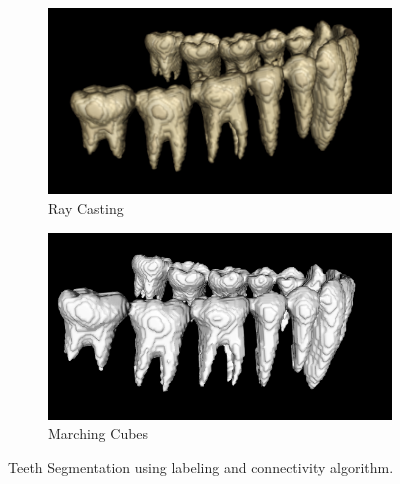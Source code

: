 \documentclass[11.5pt, b5paper]{article}
\begin{document}
\begin{figure}
    \centering
    \begin{subfigure}[b]{0.45\textwidth}
        \centering
        \includegraphics[width=\textwidth]{RCSO}
        \caption{Ray Casting}
    \end{subfigure}
    \hfill
    \begin{subfigure}[b]{0.45\textwidth}
        \centering
        \includegraphics[width=\textwidth]{MCSO}
        \caption{Marching Cubes}
    \end{subfigure}
    \caption{Teeth Segmentation using labeling and connectivity algorithm.}
    \label{fig:CL}
\end{figure}
\end{document}

